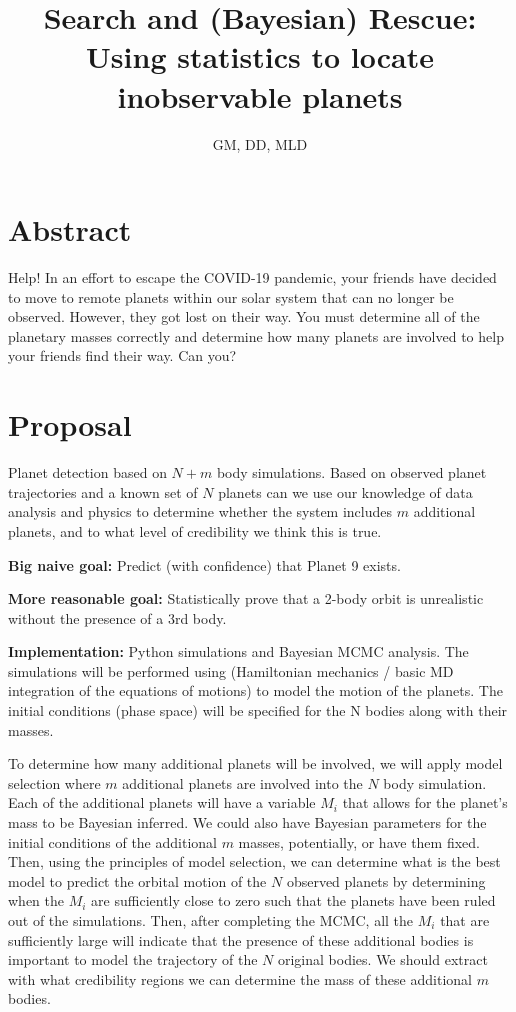\documentclass{article}
\title{Search and (Bayesian) Rescue: Using statistics to locate inobservable planets}
\author{GM, DD, MLD}
\begin{document}
\maketitle

\section{Abstract} Help! In an effort to escape the COVID-19 pandemic, your friends have decided to move to remote planets within our solar system that can no longer be observed. However, they got lost on their way. You must determine all of the planetary masses correctly and determine how many planets are involved to help your friends find their way. Can you?

\section{Proposal}

Planet detection based on $N + m$ body simulations. Based on observed planet trajectories and a known set of $N$ planets can we use our knowledge of data analysis and physics to determine whether the system includes $m$ additional planets, and to what level of credibility we think this is true.

\textbf{Big naive goal:} Predict (with confidence) that Planet 9 exists.

\textbf{More reasonable goal:} Statistically prove that a 2-body orbit is unrealistic without the presence of a 3rd body.

\textbf{Implementation:} Python simulations and Bayesian MCMC analysis. The simulations will be performed using (Hamiltonian mechanics / basic MD integration of the equations of motions) to model the motion of the planets. The initial conditions (phase space) will be specified for the N bodies along with their masses. 

To determine how many additional planets will be involved, we will apply model selection where $m$ additional planets are involved into the $N$ body simulation. Each of the additional planets will have a variable $M_i$ that allows for the planet's mass to be Bayesian inferred. We could also have Bayesian parameters for the initial conditions of the additional $m$ masses, potentially, or have them fixed. Then, using the principles of model selection, we can determine what is the best model to predict the orbital motion of the $N$ observed planets by determining when the $M_i$ are sufficiently close to zero such that the planets have been ruled out of the simulations. Then, after completing the MCMC, all the $M_i$ that are sufficiently large will indicate that the presence of these additional bodies is important to model the trajectory of the $N$ original bodies. We should extract with what credibility regions we can determine the mass of these additional $m$ bodies.
\end{document}

